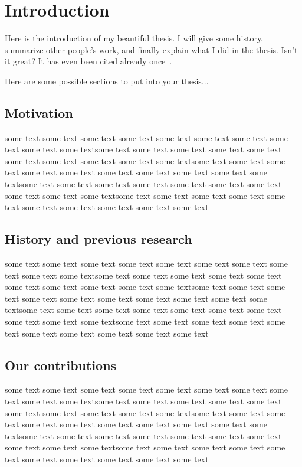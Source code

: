 \chapter{Introduction}
\label{chap:intro}

Here is the introduction of my beautiful thesis.  I will give some
history, summarize other people's work, and finally explain what I did
in the thesis.  Isn't it great?  It has even been cited already
once~\cite{xxxx}.

Here are some possible sections to put into your thesis...

\section{Motivation}
\label{sec:motivation}

some text some text some text some text some text some text some text
some text some text some textsome text some text some text some text
some text some text some text some text some text some textsome text
some text some text some text some text some text some text some text
some text some textsome text some text some text some text some text
some text some text some text some text some textsome text some text
some text some text some text some text some text some text some text
some text

\section{History and previous research}
\label{sec:history}

some text some text some text some text some text some text some text
some text some text some textsome text some text some text some text
some text some text some text some text some text some textsome text
some text some text some text some text some text some text some text
some text some textsome text some text some text some text some text
some text some text some text some text some textsome text some text
some text some text some text some text some text some text some text
some text

\section{Our contributions}
\label{sec:contribution}

some text some text some text some text some text some text some text
some text some text some textsome text some text some text some text
some text some text some text some text some text some textsome text
some text some text some text some text some text some text some text
some text some textsome text some text some text some text some text
some text some text some text some text some textsome text some text
some text some text some text some text some text some text some text
some text


